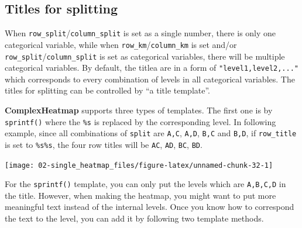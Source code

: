 \documentclass[]{book}
\newenvironment{Shaded}{\begin{snugshade}}{\end{snugshade}}
\newcommand{\KeywordTok}[1]{\textcolor[rgb]{0.13,0.29,0.53}{\textbf{#1}}}
\newcommand{\DataTypeTok}[1]{\textcolor[rgb]{0.13,0.29,0.53}{#1}}
\newcommand{\DecValTok}[1]{\textcolor[rgb]{0.00,0.00,0.81}{#1}}
\newcommand{\StringTok}[1]{\textcolor[rgb]{0.31,0.60,0.02}{#1}}
\newcommand{\NormalTok}[1]{#1}
\theoremstyle{definition}
\theoremstyle{definition}
\theoremstyle{definition}
\theoremstyle{remark}
\begin{document}
\subsection{Titles for splitting}\label{titles-for-splitting}

When \texttt{row\_split}/\texttt{column\_split} is set as a single
number, there is only one categorical variable, while when
\texttt{row\_km}/\texttt{column\_km} is set and/or
\texttt{row\_split}/\texttt{column\_split} is set as categorical
variables, there will be multiple categorical variables. By default, the
titlea are in a form of \texttt{"level1,level2,..."} which corresponds
to every combination of levels in all categorical variables. The titles
for splitting can be controlled by ``a title template''.

\textbf{ComplexHeatmap} supports three types of templates. The first one
is by \texttt{sprintf()} where the \texttt{\%s} is replaced by the
corresponding level. In following example, since all combinations of
\texttt{split} are \texttt{A,C}, \texttt{A,D}, \texttt{B,C} and
\texttt{B,D}, if \texttt{row\_title} is set to
\texttt{\%s\textbar{}\%s}, the four row titles will be
\texttt{A\textbar{}C}, \texttt{A\textbar{}D}, \texttt{B\textbar{}C},
\texttt{B\textbar{}D}.

\begin{Shaded}
\end{Shaded}

\begin{center}\texttt{[image: 02-single\_heatmap\_files/figure-latex/unnamed-chunk-32-1]} \end{center}

For the \texttt{sprintf()} template, you can only put the levels which
are \texttt{A,B,C,D} in the title. However, when making the heatmap, you
might want to put more meaningful text instead of the internal levels.
Once you know how to correspond the text to the level, you can add it by
following two template methods.
\end{document}
